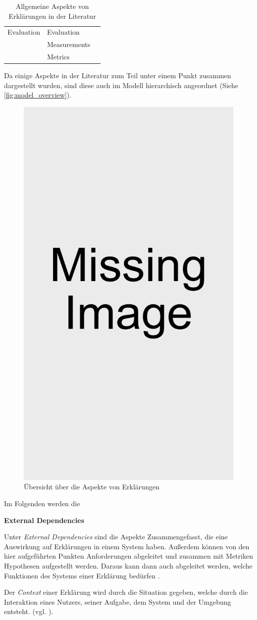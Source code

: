 \begin{table}
\begin{center}
\begin{tabular}{|p{}|p{}|p{}|}
            \hline
            Evaluation      & Evaluation    & \cite{kohl_explainability_2019} \cite{doshi2017towards} \\
                            & Measurements  & \cite{waa_evaluating_2021} \cite{balog_measuring_2020} \\
                            & Metrics       & \cite{nunes_systematic_2017} \cite{anjomshoae2019explainable} \cite{chari_explanation_2020} \cite{waa_evaluating_2021}\\
            \hline
        \end{tabular}
    \end{center}
    \caption{Allgemeine Aspekte von Erklärungen in der Literatur}
    \label{tab:model_explaination_aspects}
\end{table}

Da einige Aspekte in der Literatur zum Teil unter einem Punkt zusammen dargestellt wurden, sind diese auch im Modell hierarchisch angeordnet (Siehe \autoref{fig:model_overview}).

\begin{figure}
    \includegraphics[width=0.2\linewidth]{contents/res/missing_image.pdf}
    \caption{Übersicht über die Aspekte von Erklärungen}
    \label{fig:model_overview}
\end{figure}

\smallbreak

Im Folgenden werden die 

\textbf{External Dependencies}

Unter \textit{External Dependencies} sind die Aspekte Zusammengefasst, die eine Auswirkung auf Erklärungen in einem System haben. Außerdem können von den hier aufgeführten Punkten Anforderungen abgeleitet und zusammen mit Metriken Hypothesen aufgestellt werden. Daraus kann dann auch abgeleitet werden, welche Funktionen des Systems einer Erklärung bedürfen \cite{kohl_explainability_2019}.

Der \textit{Context} einer Erklärung wird durch die Situation gegeben, welche durch die Interaktion eines Nutzers, seiner Aufgabe, dem System und der Umgebung entsteht. (vgl. \cite{chazette_knowledge_nodate, kohl_explainability_2019}).

